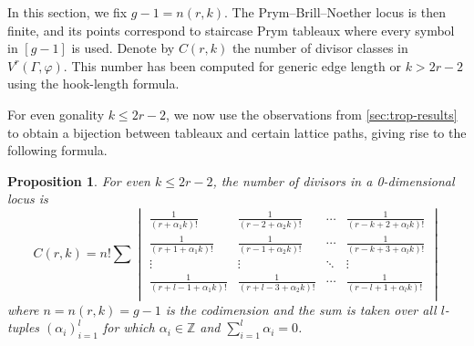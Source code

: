 \documentclass[11pt,reqno]{amsart}
\newcommand*{\Z}{\mathbb{Z}}
\newcommand{\derek}[1]{{\color{Green} \sf D: [#1]}}
\newcommand{\steven}[1]{\textcolor{pink}{\sf S: [#1]}}
\theoremstyle{definition}
\theoremstyle{problem}
\theoremstyle{plain}
\newtheorem{proposition}[definition]{Proposition}
\theoremstyle{remark}
\theoremstyle{theorem}
\numberwithin{equation}{section}
\numberwithin{figure}{section}
\begin{document}
In this section, we fix $g-1=n(r,k)$. The Prym--Brill--Noether locus is then finite, and its points correspond to staircase Prym
tableaux where every symbol in $[g-1]$ is used. Denote by $C(r,k)$ the number of divisor classes in $V^r(\Gamma,\varphi)$. 
This number has been computed \cite[Corollary~6.1.5]{len2019skeletons} for generic edge length or $k>2r-2$ using the hook-length formula. 

 For even gonality $k\leq 2r-2$, we now use the observations from \cref{sec:trop-results} to obtain a bijection between tableaux and certain lattice paths, giving rise to the following formula. 




\begin{proposition}\label{prop:card}
  For even $k\leq2r-2$, the number of divisors in a 0-dimensional locus is
    \begin{equation} \label{eq:3}
    C(r,k) = n!\sum
    \begin{vmatrix}
      \frac{1}{(r+\alpha_1 k)!} & \frac{1}{(r-2+\alpha_2 k)!} & \cdots
      & \frac{1}{(r-k+2+\alpha_l k)!}\\
      \frac{1}{(r+1+\alpha_1 k)!} & \frac{1}{(r-1+\alpha_2 k)!} &
      \cdots
      & \frac{1}{(r-k+3+\alpha_l k)!}\\
      \vdots & \vdots & \ddots & \vdots\\
      \frac{1}{(r+l-1+\alpha_1 k)!} & \frac{1}{(r+l-3+\alpha_2 k)!}
      & \cdots & \frac{1}{(r-l+1+\alpha_l k)!}\\
    \end{vmatrix}
    \end{equation}
    where $n=n(r,k)=g-1$ is the codimension and the sum is taken over
    all $l$-tuples $(\alpha_i)_{i=1}^l$ for which $\alpha_i \in \Z$ and
    $\sum_{i=1}^l\alpha_i=0$.
\end{proposition}
\end{document}
